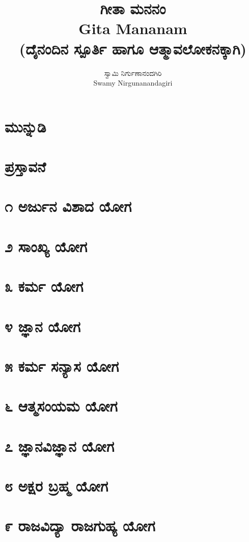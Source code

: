 \documentclass[12pt,twoside,openright,a5paper]{book}
\title{\Huge \kanfont ಗೀತಾ ಮನನಂ\\Gita Mananam\\\small(ದೈನಂದಿನ ಸ್ಪೂರ್ತಿ ಹಾಗೂ ಆತ್ಮಾವಲೋಕನಕ್ಕಾಗಿ)}
\author{\large \kanfont ಸ್ವಾಮಿ ನಿರ್ಗುಣಾನಂದಗಿರಿ\\Swamy Nirgunanandagiri}
\date{} %
\begin{document}
\maketitle

\thispagestyle{empty}
\tableofcontents
\thispagestyle{empty}
\thispagestyle{empty}
\pagestyle{fancy}
\chapter{\kanfont ಮುನ್ನುಡಿ}

\chapter{\kanfont ಪ್ರಸ್ತಾವನೆ}

\chapter{\kanfont ೧ ಅರ್ಜುನ ವಿಶಾದ ಯೋಗ}

\makeatletter\@openrightfalse
\chapter{\kanfont ೨ ಸಾಂಖ್ಯ ಯೋಗ}
\chapter{\kanfont ೩ ಕರ್ಮ ಯೋಗ}
\chapter{\kanfont ೪ ಜ್ಞಾನ ಯೋಗ}
\chapter{\kanfont ೫ ಕರ್ಮ ಸನ್ಯಾಸ ಯೋಗ}

\chapter{\kanfont ೬ ಆತ್ಮಸಂಯಮ ಯೋಗ}
\chapter{\kanfont ೭ ಜ್ಞಾನವಿಜ್ಞಾನ ಯೋಗ}
\chapter{\kanfont ೮ ಅಕ್ಷರ ಬ್ರಹ್ಮ ಯೋಗ}
\chapter{\kanfont ೯ ರಾಜವಿದ್ಯಾ ರಾಜಗುಹ್ಯ ಯೋಗ}
\end{document}
